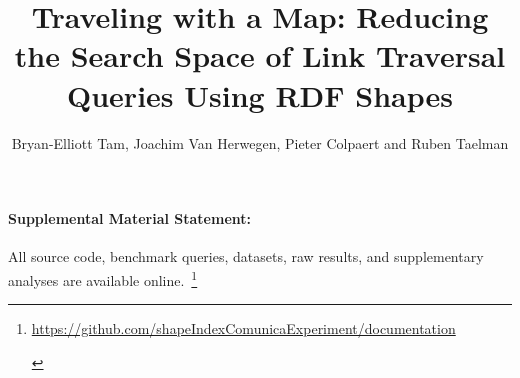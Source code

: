 \documentclass[Afour,sageh,times]{sagej}
\newif\ifanonymous
\begin{document}

\title{Traveling with a Map: Reducing the Search Space of Link Traversal Queries Using RDF Shapes}
\ifanonymous
      \author{Anonymous}
    \else
      \author{Bryan-Elliott Tam, Joachim Van Herwegen, Pieter Colpaert and Ruben Taelman}



   \fi 





\maketitle










\paragraph*{Supplemental Material Statement:}\label{sec:supplementalMaterial} All source code, benchmark queries, datasets, raw results, and supplementary analyses are available online.~\footnote{
    \ifanonymous
       \url{https://anonymous.4open.science/r/documentation-1A65}
    \else
       \url{https://github.com/shapeIndexComunicaExperiment/documentation}
    \fi 
    \label{sf:supplementalMaterial}}



\printbibliography
{}


\end{document}
